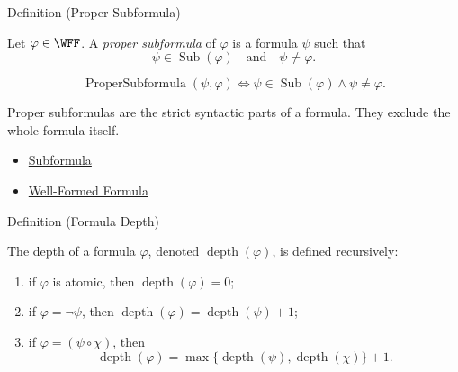 \begin{definitionbox}{Definition (Proper Subformula)}
\begin{definition}
\label{def:proper-subformula}
Let \(\varphi\in\WFF\). A \emph{proper subformula} of \(\varphi\) is a
formula \(\psi\) such that
\[
\psi\in\operatorname{Sub}(\varphi)
\quad\text{and}\quad
\psi\neq\varphi.
\]
\end{definition}
\end{definitionbox}

\begin{remark*}
\[
\operatorname{ProperSubformula}(\psi,\varphi)
\Longleftrightarrow
\psi\in\operatorname{Sub}(\varphi)\land\psi\neq\varphi.
\]
\end{remark*}

\begin{remark*}[Interpretation]
Proper subformulas are the strict syntactic parts of a formula. They exclude the
whole formula itself.
\end{remark*}

\begin{dependencies}
\begin{itemize}
  \item \hyperref[def:subformula-propositional-logic]{Subformula}
  \item \hyperref[def:well-formed-formula]{Well-Formed Formula}
\end{itemize}
\end{dependencies}

\begin{definitionbox}{Definition (Formula Depth)}
\begin{definition}
\label{def:formula-depth-propositional-logic}
The depth of a formula \(\varphi\), denoted \(\operatorname{depth}(\varphi)\), is defined recursively:
\begin{enumerate}
\item if \(\varphi\) is atomic, then \(\operatorname{depth}(\varphi)=0\);
\item if \(\varphi=\neg\psi\), then \(\operatorname{depth}(\varphi)=\operatorname{depth}(\psi)+1\);
\item if \(\varphi=(\psi\circ\chi)\), then
\[
\operatorname{depth}(\varphi)=\max\{\operatorname{depth}(\psi),\operatorname{depth}(\chi)\}+1.
\]
\end{enumerate}
\end{definition}
\end{definitionbox}

